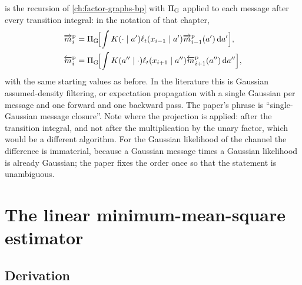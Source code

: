  is the recursion of \cref{ch:factor-graphs-bp} with
$\Pi_{\mathrm{G}}$ applied to each message after every transition integral: in the notation of
that chapter,
\begin{equation}
\begin{aligned}
  \overrightarrow{m}^{\mathrm p}_i&=\Pi_{\mathrm{G}}\!\Bigl[\int K(\cdot\mid a')\ell_t(x_{i-1}\mid a')\overrightarrow{m}^{\mathrm p}_{i-1}(a')\,\mathrm{d} a'\Bigr],\\
  \overleftarrow{m}^{\mathrm p}_i&=\Pi_{\mathrm{G}}\!\Bigl[\int K(a''\mid\cdot)\ell_t(x_{i+1}\mid a'')\overleftarrow{m}^{\mathrm p}_{i+1}(a'')\,\mathrm{d} a''\Bigr],
\end{aligned}
  \label{eq:gc-projected}
\end{equation}
with the same starting values as before. In the literature this is Gaussian
assumed-density filtering, or expectation propagation with a single Gaussian per
message and one forward and one backward pass. The paper's phrase is ``single-Gaussian
message closure''. Note where the projection is applied: after the transition integral,
and not after the multiplication by the unary factor, which would be a different
algorithm. For the Gaussian likelihood of the channel the difference is immaterial,
because a Gaussian message times a Gaussian likelihood is already Gaussian; the paper
fixes the order once so that the statement is unambiguous.

\section{The linear minimum-mean-square estimator}

\subsection{Derivation}

